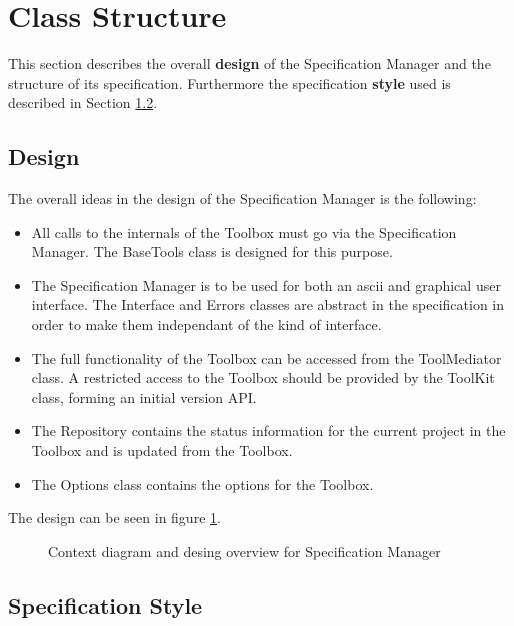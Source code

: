 \documentclass[11pt]{article}
\def\insertfig#1#2#3#4{ %
\begin{figure}
\begin{center}
\epsfig{file=#1,width=#2,angle=-90}
\end{center}
\caption{#3} \label{#4}
\end{figure} 
}
\newcommand{\specman} {Specification Manager}
\begin{document}
\section{Class Structure}

This section describes the overall {\bf design} of the Specification
Manager and the structure of its specification. Furthermore the
specification {\bf style} used is described in Section
\ref{sec:style}.

\subsection{Design}
The overall ideas in the design of the \specman{} is the following:
\begin{itemize}
\item All calls to the internals of the Toolbox must go via the
  \specman{}. The BaseTools class is designed for this purpose. 
\item The \specman{} is to be used for both an ascii and graphical
  user interface. The Interface and Errors classes are abstract in the
  specification in order to make them independant of the kind of
  interface. 
\item The full functionality of the Toolbox can be accessed from the
  ToolMediator class. A restricted access to the Toolbox should be
  provided by the ToolKit class, forming an initial version API.
\item The Repository contains the status information for the current
  project in the Toolbox and is updated from the Toolbox. 
\item The Options class contains the options for the Toolbox. 
\end{itemize}

The design can be seen in figure \ref{fig:speccontext}.

\begin{figure}
\begin{center}
\end{center}
\caption{Context diagram and desing overview for \specman} \label{fig:speccontext}
\end{figure} 


\subsection{Specification Style}
\label{sec:style}
\end{document}
